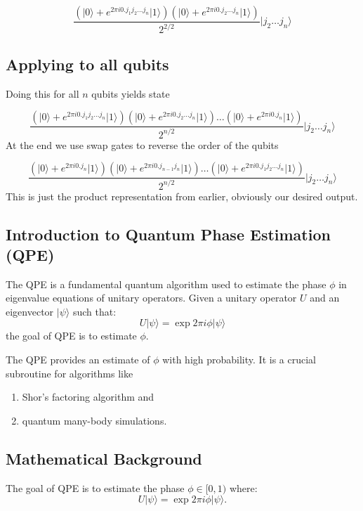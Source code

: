 \documentclass[%
oneside,                 %
final,                   %
10pt]{article}
\begin{document}
\[
\frac{\left(\vert 0 \rangle + e^{2\pi i 0.j_1j_2\dots j_n}\vert 1\rangle\right)\left(\vert 0 \rangle + e^{2\pi i 0.j_2\dots j_n}\vert 1\rangle\right)}{2^{2/2}} \vert j_2 \dots j_n\rangle
\]

\subsection{Applying to all qubits}

Doing this for all $n$ qubits yields state

\[
\frac{\left(\vert 0 \rangle + e^{2\pi i 0.j_1j_2\dots j_n}\vert 1\rangle\right)\left(\vert 0 \rangle + e^{2\pi i 0.j_2\dots j_n}\vert 1\rangle\right)\dots \left(\vert 0 \rangle + e^{2\pi i 0.j_n}\vert 1\rangle\right)}{2^{n/2}} \vert j_2 \dots j_n\rangle
\]
At the end we use swap gates to reverse the order of the qubits

\[
\frac{\left(\vert 0 \rangle + e^{2\pi i 0.j_n}\vert 1\rangle\right)\left(\vert 0 \rangle + e^{2\pi i 0.j_{n-1}j_n}\vert 1\rangle\right)\dots\left(\vert 0 \rangle + e^{2\pi i 0.j_1j_2\dots j_n}\vert 1\rangle\right) }{2^{n/2}} \vert j_2 \dots j_n\rangle
\]
This is just the product representation from earlier, obviously our desired output.

\subsection{Introduction to Quantum Phase Estimation (QPE)}
The QPE is a fundamental quantum algorithm used to estimate the phase $\phi$ in eigenvalue equations of unitary operators.
Given a unitary operator $U$ and an eigenvector $| \psi \rangle$ such that:
\[
U | \psi \rangle = \exp{2\pi i \phi} | \psi \rangle
\]
the goal of QPE is to estimate $\phi$.

The QPE provides an estimate of $\phi$ with high probability. It is a
crucial subroutine for algorithms like
\begin{enumerate}
\item Shor's factoring algorithm and

\item quantum many-body simulations.
\end{enumerate}

\noindent
\subsection{Mathematical Background}

The goal of QPE is to estimate the phase $\phi \in [0,1)$ where:
\[
    U\vert \psi\rangle = \exp{2\pi i \phi} \vert\psi\rangle.
\]
\end{document}
